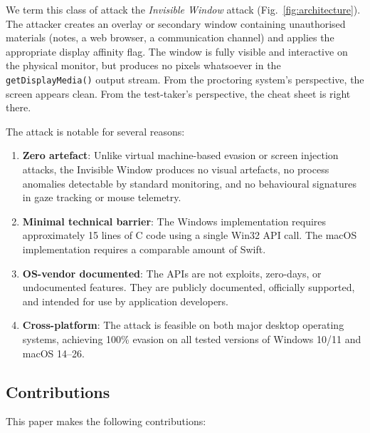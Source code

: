 \documentclass[conference]{IEEEtran}
\begin{document}
We term this class of attack the \textit{Invisible Window} attack (Fig.~\ref{fig:architecture}). The attacker creates an overlay or secondary window containing unauthorised materials (notes, a web browser, a communication channel) and applies the appropriate display affinity flag. The window is fully visible and interactive on the physical monitor, but produces no pixels whatsoever in the \texttt{getDisplayMedia()} output stream. From the proctoring system's perspective, the screen appears clean. From the test-taker's perspective, the cheat sheet is right there.

The attack is notable for several reasons:

\begin{enumerate}
\item \textbf{Zero artefact}: Unlike virtual machine-based evasion or screen injection attacks, the Invisible Window produces no visual artefacts, no process anomalies detectable by standard monitoring, and no behavioural signatures in gaze tracking or mouse telemetry.

\item \textbf{Minimal technical barrier}: The Windows implementation requires approximately 15 lines of C code using a single Win32 API call. The macOS implementation requires a comparable amount of Swift.

\item \textbf{OS-vendor documented}: The APIs are not exploits, zero-days, or undocumented features. They are publicly documented, officially supported, and intended for use by application developers.

\item \textbf{Cross-platform}: The attack is feasible on both major desktop operating systems, achieving 100\% evasion on all tested versions of Windows 10/11 and macOS 14--26.
\end{enumerate}

\subsection{Contributions}

This paper makes the following contributions:
\end{document}
